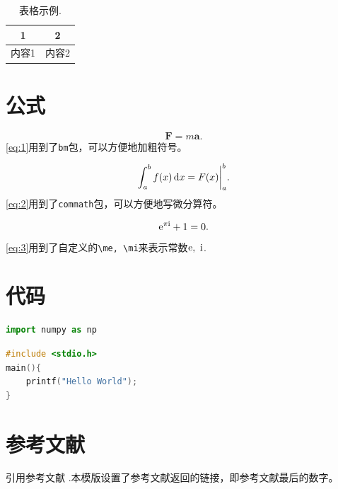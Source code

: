 \documentclass[12pt]{article}
\begin{document}
\begin{table}[htp]
	\centering
	\caption{表格示例.}
	\begin{tabular}{cc}
		\toprule  1 & 2     \\
		\midrule
		内容1       & 内容2 \\
		\bottomrule
	\end{tabular}
	\label{tab:1}
\end{table}

\section{公式}


\begin{equation}
	\bm{F} = m\bm{a}.
	\label{eq:1}
\end{equation}
\cref{eq:1}用到了\texttt{bm}包，可以方便地加粗符号。

\begin{equation}
	\int^b_a f(x) \dif x=F(x)\bigg|^b_a.
	\label{eq:2}
\end{equation}
\cref{eq:2}用到了\texttt{commath}包，可以方便地写微分算符。

\begin{equation}
	\mathrm{e} ^{\pi \mathrm{i}} + 1 = 0.
	\label{eq:3}
\end{equation}
\cref{eq:3}用到了自定义的\verb|\me, \mi|来表示常数$\mathrm{e},\ \mathrm{i}$.

\section{代码}


\begin{lstlisting}[language=python]
import numpy as np
\end{lstlisting}

\begin{lstlisting}[language=c]
#include <stdio.h>
main(){
    printf("Hello World");
}
\end{lstlisting}

\section{参考文献}

引用参考文献 .本模版设置了参考文献返回的链接，即参考文献最后的数字。\cite{olsthoorn}




\end{document}
